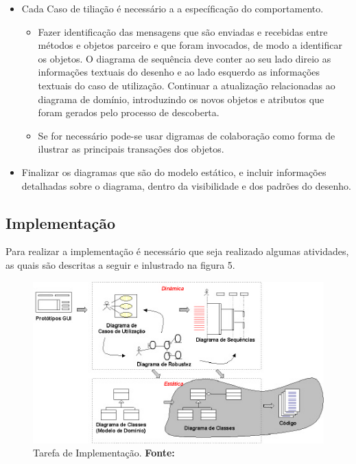 \begin{itemize}
  \item Cada Caso de tiliação é necessário a a específicação do comportamento.
 	
 	\begin{itemize}
 	  \item  Fazer identificação das mensagens que são enviadas e recebidas entre
 	  métodos e objetos parceiro e que foram invocados, de modo a identificar os
 	  objetos. O diagrama de sequência deve conter ao seu lado direio as
 	  informações textuais do desenho e ao lado esquerdo as informações textuais
 	  do caso de utilização. Continuar a atualização relacionadas ao diagrama de domínio,
  	  introduzindo os novos objetos e atributos que foram gerados pelo processo
  	  de descoberta.
 	  \item Se for necessário pode-se usar digramas de colaboração como forma de
 	  ilustrar as principais transações dos objetos.
 	\end{itemize}
 	
 	\item Finalizar os diagramas que são do modelo estático, e incluir informações
 	detalhadas sobre o diagrama, dentro da visibilidade e dos padrões do desenho.
 	
\end{itemize} 


\subsection{Implementação}

\par Para realizar a implementação é necessário que seja
realizado algumas atividades, as quais são descritas a seguir e inlustrado na
figura 5.

\begin{figure}[h!]
  \centerline{\includegraphics[scale=1.2]{./imagens/iconix5.png}}
  \caption[Tarefa de Implementação]
          {Tarefa de Implementação. \textbf{Fonte:}
          \cite{UML_Silva_Videira}}
\label{fig:exemplo1}
\end{figure}


